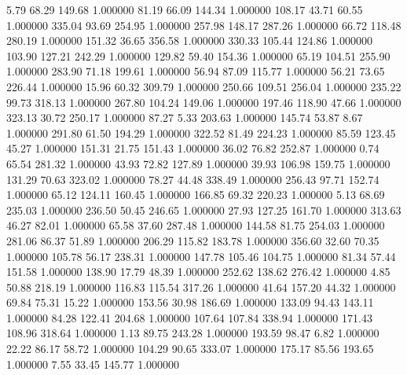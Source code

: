       5.79     68.29    149.68  1.000000
     81.19     66.09    144.34  1.000000
    108.17     43.71     60.55  1.000000
    335.04     93.69    254.95  1.000000
    257.98    148.17    287.26  1.000000
     66.72    118.48    280.19  1.000000
    151.32     36.65    356.58  1.000000
    330.33    105.44    124.86  1.000000
    103.90    127.21    242.29  1.000000
    129.82     59.40    154.36  1.000000
     65.19    104.51    255.90  1.000000
    283.90     71.18    199.61  1.000000
     56.94     87.09    115.77  1.000000
     56.21     73.65    226.44  1.000000
     15.96     60.32    309.79  1.000000
    250.66    109.51    256.04  1.000000
    235.22     99.73    318.13  1.000000
    267.80    104.24    149.06  1.000000
    197.46    118.90     47.66  1.000000
    323.13     30.72    250.17  1.000000
     87.27      5.33    203.63  1.000000
    145.74     53.87      8.67  1.000000
    291.80     61.50    194.29  1.000000
    322.52     81.49    224.23  1.000000
     85.59    123.45     45.27  1.000000
    151.31     21.75    151.43  1.000000
     36.02     76.82    252.87  1.000000
      0.74     65.54    281.32  1.000000
     43.93     72.82    127.89  1.000000
     39.93    106.98    159.75  1.000000
    131.29     70.63    323.02  1.000000
     78.27     44.48    338.49  1.000000
    256.43     97.71    152.74  1.000000
     65.12    124.11    160.45  1.000000
    166.85     69.32    220.23  1.000000
      5.13     68.69    235.03  1.000000
    236.50     50.45    246.65  1.000000
     27.93    127.25    161.70  1.000000
    313.63     46.27     82.01  1.000000
     65.58     37.60    287.48  1.000000
    144.58     81.75    254.03  1.000000
    281.06     86.37     51.89  1.000000
    206.29    115.82    183.78  1.000000
    356.60     32.60     70.35  1.000000
    105.78     56.17    238.31  1.000000
    147.78    105.46    104.75  1.000000
     81.34     57.44    151.58  1.000000
    138.90     17.79     48.39  1.000000
    252.62    138.62    276.42  1.000000
      4.85     50.88    218.19  1.000000
    116.83    115.54    317.26  1.000000
     41.64    157.20     44.32  1.000000
     69.84     75.31     15.22  1.000000
    153.56     30.98    186.69  1.000000
    133.09     94.43    143.11  1.000000
     84.28    122.41    204.68  1.000000
    107.64    107.84    338.94  1.000000
    171.43    108.96    318.64  1.000000
      1.13     89.75    243.28  1.000000
    193.59     98.47      6.82  1.000000
     22.22     86.17     58.72  1.000000
    104.29     90.65    333.07  1.000000
    175.17     85.56    193.65  1.000000
      7.55     33.45    145.77  1.000000
